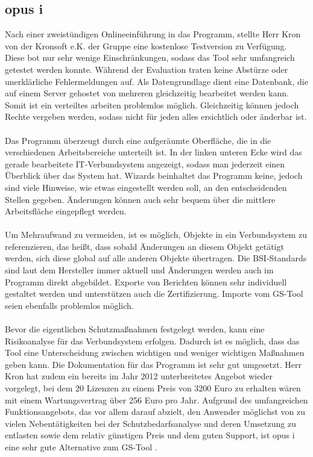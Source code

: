 \subsection{opus i}
Nach einer zweistündigen Onlineeinführung in das Programm, stellte Herr Kron von der Kronsoft e.K. der Gruppe eine kostenlose Testversion zu Verfügung. Diese bot nur sehr wenige Einschränkungen, sodass das Tool sehr umfangreich getestet werden konnte. Während der Evaluation traten keine Abstürze oder unerklärliche Fehlermeldungen auf. Als Datengrundlage dient eine Datenbank, die auf einem Server gehostet von mehreren gleichzeitig bearbeitet werden kann. Somit ist ein verteiltes arbeiten problemlos möglich. Gleichzeitig können jedoch Rechte vergeben werden, sodass nicht für jeden alles ersichtlich oder änderbar ist. 
\\
\\
Das Programm überzeugt durch eine aufgeräumte Oberfläche, die in die verschiedenen Arbeitsbereiche unterteilt ist. In der linken unteren Ecke wird das gerade bearbeitete IT-Verbundsystem angezeigt, sodass man jederzeit einen Überblick über das System hat. Wizards beinhaltet das Programm keine, jedoch sind viele Hinweise, wie etwas eingestellt werden soll, an den entscheidenden Stellen gegeben. Änderungen können auch sehr bequem über die mittlere Arbeitsfläche eingepflegt werden.
\\
\\
Um Mehraufwand zu vermeiden, ist es möglich, Objekte in ein Verbundsystem zu referenzieren, das heißt, dass sobald Änderungen an diesem Objekt getätigt werden, sich diese global auf alle anderen Objekte übertragen. Die BSI-Standards sind laut dem Hersteller immer aktuell und Änderungen werden auch im Programm direkt abgebildet. Exporte von Berichten können sehr individuell gestaltet werden und unterstützen auch die Zertifizierung. Importe vom GS-Tool seien ebenfalls problemlos möglich.
\\
\\
Bevor die eigentlichen Schutzmaßnahmen festgelegt werden, kann eine Risikoanalyse für das Verbundsystem erfolgen. Dadurch ist es möglich, dass das Tool eine Unterscheidung zwischen wichtigen und weniger wichtigen Maßnahmen geben kann. Die Dokumentation für das Programm ist sehr gut umgesetzt. Herr Kron hat zudem ein bereits im Jahr 2012 unterbreitetes Angebot wieder vorgelegt, bei dem 20 Lizenzen zu einem Preis von 3200 Euro zu erhalten wären mit einem Wartungsvertrag über 256 Euro pro Jahr. Aufgrund des umfangreichen Funktionsangebots, das vor allem darauf abzielt, den Anwender möglichst von zu vielen Nebentätigkeiten bei der Schutzbedarfsanalyse und deren Umsetzung zu entlasten sowie dem relativ günstigen Preis und dem guten Support, ist opus i eine sehr gute Alternative zum GS-Tool \cite{opusi}.